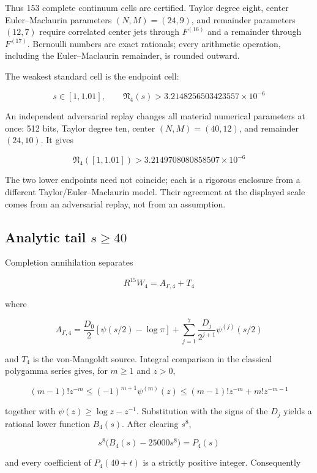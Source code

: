 \documentclass[
  11pt,
]{book}
\begin{document}
Thus 153 complete continuum cells are certified. Taylor degree eight,
center Euler--Maclaurin parameters \((N,M)=(24,9)\), and remainder
parameters \((12,7)\) require correlated center jets through
\(F^{(16)}\) and a remainder through \(F^{(17)}\). Bernoulli numbers are
exact rationals; every arithmetic operation, including the
Euler--Maclaurin remainder, is rounded outward.

The weakest standard cell is the endpoint cell:

\[
s\in[1,1.01],\qquad
\mathfrak N_4(s)>
3.2148256503423557\times10^{-6}
\tag{74.5}
\]

An independent adversarial replay changes all material numerical
parameters at once: 512 bits, Taylor degree ten, center
\((N,M)=(40,12)\), and remainder \((24,10)\). It gives

\[
\mathfrak N_4([1,1.01])>
3.2149708080858507\times10^{-6}
\tag{74.6}
\]

The two lower endpoints need not coincide; each is a rigorous enclosure
from a different Taylor/Euler--Maclaurin model. Their agreement at the
displayed scale comes from an adversarial replay, not from an
assumption.

\subsection{\texorpdfstring{Analytic tail
\(s\ge40\)}{Analytic tail s\textbackslash ge40}}\label{analytic-tail-sge40}

Completion annihilation separates

\[
R^{15}W_4=A_{\Gamma,4}+T_4
\tag{74.7}
\]

where

\[
A_{\Gamma,4}
=\frac{D_0}{2}\left[\psi(s/2)-\log\pi\right]
+\sum_{j=1}^{7}\frac{D_j}{2^{j+1}}\psi^{(j)}(s/2)
\tag{74.8}
\]

and \(T_4\) is the von-Mangoldt source. Integral comparison in the
classical polygamma series gives, for \(m\ge1\) and \(z>0\),

\[
(m-1)!z^{-m}
\le (-1)^{m+1}\psi^{(m)}(z)
\le (m-1)!z^{-m}+m!z^{-m-1}
\tag{74.9}
\]

together with \(\psi(z)\ge\log z-z^{-1}\). Substitution with the signs
of the \(D_j\) yields a rational lower function \(B_4(s)\). After
clearing \(s^8\),

\[
s^8\bigl(B_4(s)-25000s^8\bigr)=P_4(s)
\tag{74.10}
\]

and every coefficient of \(P_4(40+t)\) is a strictly positive integer.
Consequently
\end{document}
